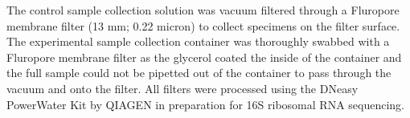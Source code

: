 The control sample collection solution was vacuum filtered through a Fluropore membrane filter (13 mm; 0.22 micron) to collect specimens on the filter surface. The experimental sample collection container was thoroughly swabbed with a Fluropore membrane filter as the glycerol coated the inside of the container and the full sample could not be pipetted out of the container to pass through the vacuum and onto the filter. All filters were processed using the DNeasy PowerWater Kit by QIAGEN in preparation for 16S ribosomal RNA sequencing.   









